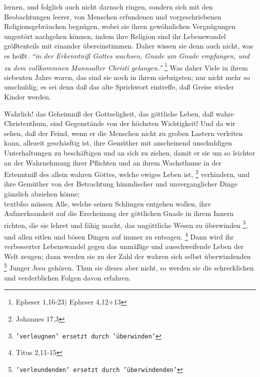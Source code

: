 {lernen, und folglich auch nicht darnach ringen, sondern sich mit den
Beobachtungen leerer, von Menschen erfundenen und vorgeschriebenen
Religionsgebräuchen begnügen, wobei sie ihren gewöhnlichen Vergnügungen
ungestört nachgehen können, indem ihre Religion sind ihr Lebenswandel
größtenteils mit einander übereinstimmen. Daher wissen sie denn auch nicht, was
es heißt.
\textit{"`in der Erkenntniß Gottes wachsen, Gnade um Gnade empfangen, und zu
dem vollkommnen Mannsalter Christi gelangen."'}
\footnote{Epheser 1,16-23) Epheser 4,12+13}
Was daher Viele in ihrem siebenten Jahre waren, das sind sie noch in
ihrem siebzigsten; nur nicht mehr so unschuldig; es sei denn daß das alte
Sprichwort eintreffe, daß Greise wieder Kinder werden.

\medskip

Wahrlich! das Geheimniß der Gottseligkeit, das göttliche
Leben, daß wahre
Christenthum, sind Gegenstände von der höchsten Wichtigkeit! Und da wir sehen,
daß der Feind, wenn er die Menschen nicht zu groben Lastern verleiten kann,
allezeit geschäsftig ist, ihre Gemüther mit anscheinend unschuldigen
Unterhaltungen zu beschäftigen und an sich zu ziehen, damit er sie um so
leichter an der Wahrnehmung ihrer Pflichten und an ihrem Wachsthume in der
Ertenntniß des allein wahren Göttes, welche ewiges Leben ist,
\footnote{Johannes 17,3}
verhindern, und ihre Gemüther von der Betrachtung himmlischer und
unverganglicher Dinge gänzlich abziehen könne;\\textbf{so müssen Alle, welche
seinen
Schlingen entgehen wollen, ihre Aufmerksamkeit auf die Erscheinung der
göttlichen Gnade in ihrem Innern richten, die sie lehret und fähig
macht, das
ungöttliche Wesen zu überwinden
\footnote{\texttt{'verleugnen' ersetzt durch 'überwinden'}}, und allen eitlen
und bösen Dingen auf immer zu
entsagen.}
\footnote{Titus 2,11-15}
Dann wird ihr verbesserter Lebenswandel gegen
das unmäßige und ausschweifende Leben der Welt zeugen; dann werden sie zu der
Zahl der wahren sich selbst überwindenden
\footnote{\texttt{'verleundenden' ersetzt durch 'überwindenden'}} Junger Jesu
gehören. Thun sie dieses
aber nicht, so werden sie die schrecklichen und verderblichen Folgen davon
erfahren.

\medskip

}
